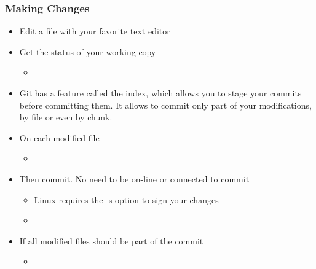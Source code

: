 \begin{frame}
  \frametitle{Making Changes}
  \begin{itemize}
  \item Edit a file with your favorite text editor
  \item Get the status of your working copy
    \begin{itemize}
    \item {}
    \end{itemize}
  \item Git has a feature called the index, which allows you to stage
    your commits before committing them. It allows to commit only part
    of your modifications, by file or even by chunk.
  \item On each modified file
    \begin{itemize}
    \item {}
    \end{itemize}
  \item Then commit. No need to be on-line or connected to commit
    \begin{itemize}
    \item Linux requires the -s option to sign your changes
    \item {}
    \end{itemize}
  \item If all modified files should be part of the commit
    \begin{itemize}
    \item {}
    \end{itemize}
  \end{itemize}
\end{frame}

